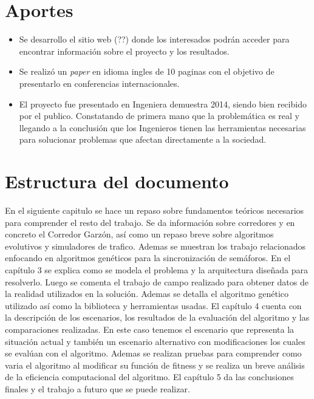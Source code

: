 \section{Aportes}

\begin{itemize}
	\item Se desarrollo el sitio web (??) donde los interesados podrán acceder para encontrar información sobre el proyecto y los resultados.
	\item Se realizó un \emph{paper} en idioma ingles de 10 paginas con el objetivo de presentarlo en conferencias internacionales.
	\item El proyecto fue presentado en Ingeniera demuestra 2014, siendo bien recibido por el publico. Constatando de primera mano que la problemática es real y llegando a la conclusión que los Ingenieros tienen las herramientas necesarias para solucionar problemas que afectan directamente a la sociedad.

\end{itemize}






\section{Estructura del documento}
En el siguiente capitulo se hace un repaso sobre fundamentos teóricos necesarios para comprender el resto del trabajo. Se da información sobre corredores y en concreto el Corredor Garzón, así como un repaso breve sobre algoritmos evolutivos y simuladores de trafico. Ademas se muestran los trabajo relacionados enfocando en algoritmos genéticos para la sincronización de semáforos.
En el capítulo 3 se explica como se modela el problema y la arquitectura diseñada  para resolverlo. Luego se comenta el trabajo de campo realizado para obtener datos de la realidad utilizados en la solución. Ademas se detalla el algoritmo genético utilizado así como la biblioteca y herramientas usadas.
El capítulo 4 cuenta con la descripción de los escenarios, los resultados de la evaluación del algoritmo y las comparaciones realizadas. En este caso tenemos el escenario que representa la situación actual y también un escenario alternativo con modificaciones los cuales se evalúan con el algoritmo. Ademas se realizan pruebas para comprender como varia el algoritmo al modificar su función de fitness y se realiza un breve análisis de la eficiencia computacional del algoritmo.
El capítulo 5 da las conclusiones finales y el trabajo a futuro que se puede realizar.






